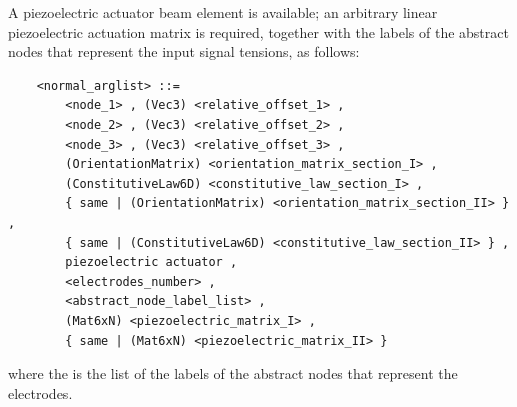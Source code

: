 \noindent
A piezoelectric actuator beam element is available; an arbitrary
linear piezoelectric actuation matrix is required, together with the labels
of the abstract nodes that represent the input signal tensions, as follows:
\begin{verbatim}
    <normal_arglist> ::=
        <node_1> , (Vec3) <relative_offset_1> ,
        <node_2> , (Vec3) <relative_offset_2> ,
        <node_3> , (Vec3) <relative_offset_3> ,
        (OrientationMatrix) <orientation_matrix_section_I> ,
        (ConstitutiveLaw6D) <constitutive_law_section_I> ,
        { same | (OrientationMatrix) <orientation_matrix_section_II> } ,
        { same | (ConstitutiveLaw6D) <constitutive_law_section_II> } ,
        piezoelectric actuator , 
        <electrodes_number> ,
        <abstract_node_label_list> ,
        (Mat6xN) <piezoelectric_matrix_I> ,
        { same | (Mat6xN) <piezoelectric_matrix_II> }
\end{verbatim}
where the  is the list of the labels of the
abstract nodes that represent the electrodes.


